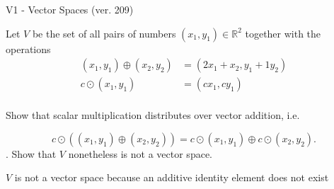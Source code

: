 \begin{exercise}
  \begin{exerciseTitle}V1 - Vector Spaces (ver. 209)\end{exerciseTitle}
  \begin{exerciseStatement}
    Let \(V\) be the set of all pairs of numbers \((x_1,y_1)\in\mathbb{R}^2\)  together with the operations 
\begin{align*}
(x_1,y_1)\oplus (x_2,y_2)&= (2x_1+x_2, y_1+1y_2)\\ 
c \odot (x_1,y_1) &= (cx_1,cy_1)\\ 
\end{align*}

	Show that scalar multiplication distributes over vector addition, i.e. 
					
\[c\odot \left((x_1,y_1)\oplus(x_2,y_2)\right)=c\odot(x_1,y_1)\oplus c\odot(x_2,y_2).\]
.
	Show that \(V\) nonetheless is not a vector space.
	


  \end{exerciseStatement}
  \begin{exerciseAnswer}
   \(V\) is not a vector space because an additive identity element does not exist
	
  


  \end{exerciseAnswer}
\end{exercise}